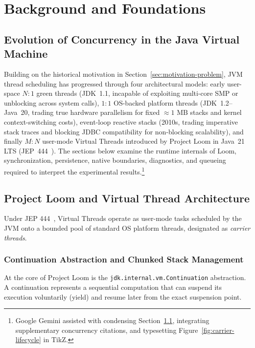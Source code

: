 \chapter{Background and Foundations}
\label{ch:background}

\section{Evolution of Concurrency in the Java Virtual Machine}
\label{sec:jvm-concurrency-evolution}

Building on the historical motivation in Section~\ref{sec:motivation-problem}, JVM thread scheduling has progressed through four architectural models: early user-space $N:1$ green threads (JDK~1.1, incapable of exploiting multi-core SMP or unblocking across system calls), $1:1$ OS-backed platform threads (JDK~1.2--Java~20, trading true hardware parallelism for fixed $\approx 1\text{ MB}$ stacks and kernel context-switching costs), event-loop reactive stacks (2010s, trading imperative stack traces and blocking JDBC compatibility for non-blocking scalability), and finally $M:N$ user-mode Virtual Threads introduced by Project Loom in Java~21 LTS (JEP~444~\cite{JEP444}). The sections below examine the runtime internals of Loom, synchronization, persistence, native boundaries, diagnostics, and queueing required to interpret the experimental results.\footnote{Google Gemini assisted with condensing Section~\ref{sec:jvm-concurrency-evolution}, integrating supplementary concurrency citations, and typesetting Figure~\ref{fig:carrier-lifecycle} in TikZ.}

\section{Project Loom and Virtual Thread Architecture}
\label{sec:loom-architecture}

Under JEP 444~\cite{JEP444}, Virtual Threads operate as user-mode tasks scheduled by the JVM onto a bounded pool of standard OS platform threads, designated as \emph{carrier threads}.

\subsection{Continuation Abstraction and Chunked Stack Management}
At the core of Project Loom is the \texttt{jdk.internal.vm.Continuation} abstraction. A continuation represents a sequential computation that can suspend its execution voluntarily (yield) and resume later from the exact suspension point.

